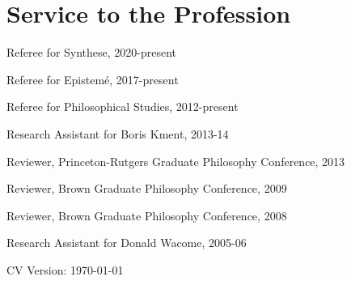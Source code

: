 \documentclass{cv_07152020}
\begin{document}
\section*{Service to the Profession}
\medskip
\begin{etaremune}
\item[] Referee for Synthese, 2020-present
\item[] Referee for Epistemé, 2017-present
\item[] Referee for Philosophical Studies, 2012-present
\item[] Research Assistant for Boris Kment, 2013-14
\item[] Reviewer, Princeton-Rutgers Graduate Philosophy Conference, 2013
\item[] Reviewer, Brown Graduate Philosophy Conference, 2009
\item[] Reviewer, Brown Graduate Philosophy Conference, 2008
\item[] Research Assistant for Donald Wacome, 2005-06
\end{etaremune}        


\vspace{3pt}

	
	\vfill \hfill CV Version: \today
	
\end{document}
